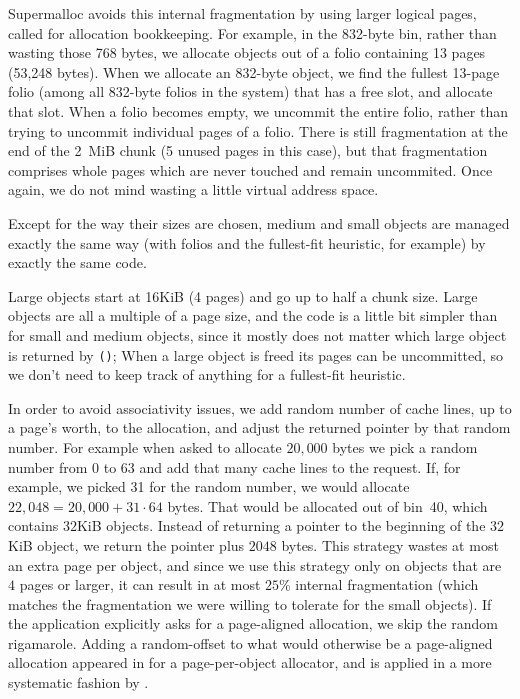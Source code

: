 \documentclass[pldi]{sigplanconf-pldi15}
\newcommand{\code}[1]{\texttt{#1}}
\begin{document}
Supermalloc avoids this internal fragmentation by using larger logical
pages, called  for allocation bookkeeping.  For example,
in the 832-byte bin, rather than wasting those 768 bytes, we allocate
objects out of a folio containing 13 pages (53,248 bytes). When we
allocate an 832-byte object, we find the fullest 13-page folio (among
all 832-byte folios in the system) that has a free slot, and allocate
that slot.  When a folio becomes empty, we uncommit the entire folio,
rather than trying to uncommit individual pages of a folio.  There is
still fragmentation at the end of the 2~MiB chunk (5 unused pages in
this case), but that fragmentation comprises whole pages which are
never touched and remain uncommited.  Once again, we do not mind
wasting a little virtual address space.

Except for the way their sizes are chosen, medium and small objects
are managed exactly the same way (with folios and the fullest-fit
heuristic, for example) by exactly the same code.


Large objects start at 16KiB (4 pages) and go up to half a chunk size.
Large objects are all a multiple of a page size, and the code is a
little bit simpler than for small and medium objects, since it mostly
does not matter which large object is returned by \code{\malloc()};
When a large object is freed its pages can be uncommitted, so we don't
need to keep track of anything for a fullest-fit heuristic.

In order to avoid associativity issues, we add random number of cache
lines, up to a page's worth, to the allocation, and adjust the
returned pointer by that random number.  For example when asked to
allocate $20,000$ bytes we pick a random number from 0 to 63 and add
that many cache lines to the request.  If, for example, we picked 31
for the random number, we would allocate $22,048 = 20,000+31\cdot64$
bytes.  That would be allocated out of bin~40, which contains $32$KiB
objects.  Instead of returning a pointer to the beginning of the
$32$KiB object, we return the pointer plus $2048$ bytes.  This
strategy wastes at most an extra page per object, and since we use
this strategy only on objects that are $4$ pages or larger, it can
result in at most $25$\% internal fragmentation (which matches the
fragmentation we were willing to tolerate for the small objects).  If
the application explicitly asks for a page-aligned allocation, we skip
the random rigamarole.  Adding a random-offset to what would otherwise
be a page-aligned allocation appeared in \cite{LvinNoBe08} for a
page-per-object allocator, and is applied in a more systematic fashion
by \cite{AfekDiMo11}.
\end{document}
